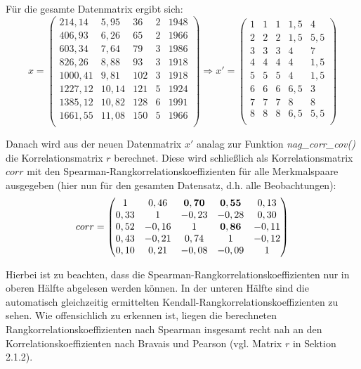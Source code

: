 \noindent Für die gesamte Datenmatrix ergibt sich:
\begin{equation*}
	x =
	\begin{pmatrix}
		214,14 & 5,95 & 36 & 2 & 1948\\
		406,93 & 6,26 & 65 & 2 & 1966\\
		603,34 & 7,64 & 79 & 3 & 1986\\
		826,26 & 8,88 & 93 & 3 & 1918\\
		1000,41 & 9,81 & 102 & 3 & 1918\\
		1227,12 & 10,14 & 121 & 5 & 1924\\
		1385,12 & 10,82 & 128 & 6 & 1991\\
		1661,55 & 11,08 & 150 & 5 & 1966\\
	\end{pmatrix}
	\Rightarrow
	x' =
	\begin{pmatrix}
		1 & 1 & 1 & 1,5 & 4\\
		2 & 2 & 2 & 1,5 & 5,5\\
		3 & 3 & 3 & 4 & 7\\
		4 & 4 & 4 & 4 & 1,5\\
		5 & 5 & 5 & 4 & 1,5\\
		6 & 6 & 6 & 6,5 & 3\\
		7 & 7 & 7 & 8 & 8\\
		8 & 8 & 8 & 6,5 & 5,5\\
	\end{pmatrix}
\end{equation*}

\noindent Danach wird aus der neuen Datenmatrix $x'$ analag zur Funktion {\it nag\_corr\_cov()} die Korrelationsmatrix $r$ berechnet. Diese wird schließlich als Korrelationsmatrix $corr$ mit den Spearman-Rangkorrelationskoeffizienten für alle Merkmalspaare ausgegeben (hier nun für den gesamten Datensatz, d.h. alle Beobachtungen):
\begin{equation*}
	corr =
	\begin{pmatrix}
		1 & 0,46 & {\bf 0,70} & {\bf 0,55} & 0,13\\
		0,33 & 1 & -0,23 & -0,28 & 0,30\\
		0,52 & -0,16 & 1 & {\bf 0,86} & -0,11\\
		0,43 & -0,21 & 0,74 & 1 & -0,12\\
		0,10 & 0,21 & -0,08 & -0,09 & 1\\
	\end{pmatrix}
\end{equation*}

\noindent Hierbei ist zu beachten, dass die Spearman-Rangkorrelationskoeffizienten nur in oberen Hälfte abgelesen werden können. In der unteren Hälfte sind die automatisch gleichzeitig ermittelten Kendall-Rangkorrelationskoeffizienten zu sehen. Wie offensichlich zu erkennen ist, liegen die berechneten Rangkorrelationskoeffizienten nach Spearman insgesamt recht nah an den Korrelationskoeffizienten nach Bravais und Pearson (vgl. Matrix $r$ in Sektion 2.1.2).

